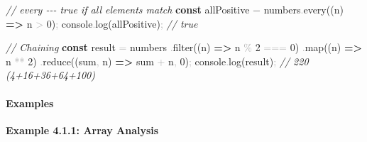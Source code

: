 \documentclass[
  justified,
  openright,
]{tufte-book}
\let\subsection\paragraph
\let\paragraph\paragraph
\newcommand{\KeywordTok}[1]{\textcolor{CodeKeyword}{\textbf{#1}}}  %
\newcommand{\CommentTok}[1]{\textcolor{CodeComment}{\textit{#1}}}  %
\newcommand{\CodeNumTok}[1]{\textcolor{CodeNumber}{#1}}             %
\newcommand{\CodeFuncTok}[1]{\textcolor{CodeKeyword}{#1}}           %
\newcommand{\OperatorTok}[1]{\textcolor{DarkGray}{#1}}              %
\newenvironment{Shaded}{%
  \begin{mdframed}[style=TufteCode]%
}{%
  \end{mdframed}%
}
\let\subsection\paragraph
\let\paragraph\paragraph
\begin{document}
\begin{Shaded}
\begin{Highlighting}[]
\CommentTok{// every {-}{-}{-} true if all elements match}
\KeywordTok{const} allPositive \OperatorTok{=} numbers\OperatorTok{.}\CodeFuncTok{every}((n) \KeywordTok{=\textgreater{}} n \OperatorTok{\textgreater{}} \CodeNumTok{0})\OperatorTok{;}
console\OperatorTok{.}\CodeFuncTok{log}(allPositive)\OperatorTok{;} \CommentTok{// true}
 
\CommentTok{// Chaining}
\KeywordTok{const} result \OperatorTok{=} numbers
  \OperatorTok{.}\CodeFuncTok{filter}((n) \KeywordTok{=\textgreater{}} n \OperatorTok{\%} \CodeNumTok{2} \OperatorTok{===} \CodeNumTok{0})
  \OperatorTok{.}\CodeFuncTok{map}((n) \KeywordTok{=\textgreater{}} n \OperatorTok{**} \CodeNumTok{2})
  \OperatorTok{.}\CodeFuncTok{reduce}((sum\OperatorTok{,} n) \KeywordTok{=\textgreater{}} sum \OperatorTok{+} n\OperatorTok{,} \CodeNumTok{0})\OperatorTok{;}
console\OperatorTok{.}\CodeFuncTok{log}(result)\OperatorTok{;} \CommentTok{// 220  (4+16+36+64+100)}
\end{Highlighting}
\end{Shaded}

\subsection{Examples}\label{examples-18}

\textbf{Example 4.1.1: Array Analysis}
\end{document}
